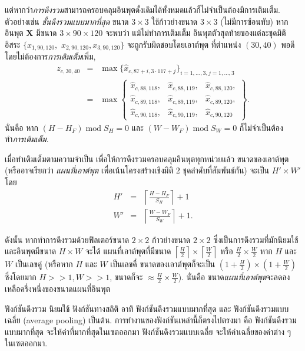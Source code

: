 แต่หากว่า\textit{การดึงรวม}สามารถครอบคลุมอินพุตดั้งเดิมได้ทั้งหมดแล้วก็ไม่จำเป็นต้องมีการเติมเต็ม.
ตัวอย่างเช่น
\textit{ชั้นดึงรวมแบบมากที่สุด} ขนาด $3 \times 3$
ใช้ก้าวย่างขนาด $3 \times 3$ (ไม่มีการซ้อนทับ)
หากอินพุต $\bm{X}$ มีขนาด $3 \times 90 \times 120$
จะพบว่า 
แม้ไม่ทำการเติมเต็ม
อินพุตตัวสุดท้ายของแต่ละชุดมิติอิสระ $\{x_{1,90,120},$ $x_{2,90,120}, x_{3,90,120} \}$ 
จะถูกรับผิดชอบโดยเอาต์พุต ที่ตำแหน่ง $(30, 40)$ พอดี
โดยไม่ต้องการ\textit{การเติมเต็ม}เพิ่ม, 
\begin{eqnarray}
z_{c,30,40} &=& \max \{ \hat{x}_{c, 87+i, 3 \cdot 117+j} \}_{i=1,\ldots, 3, j=1,\ldots, 3}  
\nonumber \\
&=& \max \left\{
\begin{array}{lllll}
\hat{x}_{c, 88, 118}, & \hat{x}_{c, 88, 119}, & \hat{x}_{c, 88, 120},
\\
\hat{x}_{c, 89, 118}, & \hat{x}_{c, 89, 119}, & \hat{x}_{c, 89, 120}, 
\\
\hat{x}_{c, 90, 118}, & \hat{x}_{c, 90, 119}, & \hat{x}_{c, 90, 120}
\end{array}
\right\}
\nonumber .
\end{eqnarray}
นั่นคือ หาก $(H - H_F) \;\mathrm{ mod }\; S_H = 0$
และ $(W - W_F) \;\mathrm{ mod }\; S_W = 0$ 
ก็ไม่จำเป็นต้องทำ\textit{การเติมเต็ม}.

เมื่อทำเติมเต็มตามความจำเป็น เพื่อให้การดึงรวมครอบคลุมอินพุตทุกหน่วยแล้ว
ขนาดของเอาต์พุต (หรืออาจเรียกว่า \textit{แผนที่เอาต์พุต} เพื่อเน้นโครงสร้างเชิงมิติ $2$ ชุดลำดับที่สัมพันธ์กัน) จะเป็น $H' \times W'$ โดย
\begin{eqnarray}
H' &=& \left\lceil \frac{H - H_F}{S_H} \right\rceil + 1
\label{eq: deep conv pooling H} \\
W' &=& \left\lceil \frac{W - W_F}{S_W} \right\rceil + 1
\label{eq: deep conv pooling W} .
\end{eqnarray}

ดังนั้น หากทำการดึงรวมด้วยฟิลเตอร์ขนาด $2 \times 2$ ก้าวย่างขนาด $2 \times 2$ ซึ่งเป็นการดึงรวมที่มักนิยมใช้
และอินพุตมีขนาด $H \times W$
จะได้
แผนที่เอาต์พุตที่มีขนาด $\left\lceil \frac{H}{2} \right\rceil \times \left\lceil \frac{W}{2} \right\rceil$ หรือ $\frac{H}{2} \times \frac{W}{2}$ หาก $H$ และ $W$ เป็นเลขคู่ (หรือหาก $H$ และ $W$ เป็นเลขคี่ ขนาดของเอาต์พุตก็จะเป็น $(1 + \frac{H}{2}) \times (1 + \frac{W}{2})$ ซึ่งโดยมาก $H >> 1, W >> 1$, ขนาดก็จะ $\approx \frac{H}{2} \times \frac{W}{2}$).
นั่นคือ ขนาด\textit{แผนที่เอาต์พุต}จะลดลงเหลือครึ่งหนึ่งของขนาดแผนที่อินพุต


ฟังก์ชันดึงรวม
นิยมใช้ ฟังก์ชันทางสถิติ
อาทิ 
ฟังก์ชันดึงรวมแบบมากที่สุด
และ
ฟังก์ชันดึงรวมแบบเฉลี่ย (average pooling)
เป็นต้น.
การทำงานของฟังก์ชันเหล่านี้ก็ตรงไปตรงมา คือ
ฟังก์ชันดึงรวมแบบมากที่สุด จะให้ค่าที่มากที่สุดในเซตออกมา
ฟังก์ชันดึงรวมแบบเฉลี่ย จะให้ค่าเฉลี่ยของค่าต่าง ๆ ในเซตออกมา.

